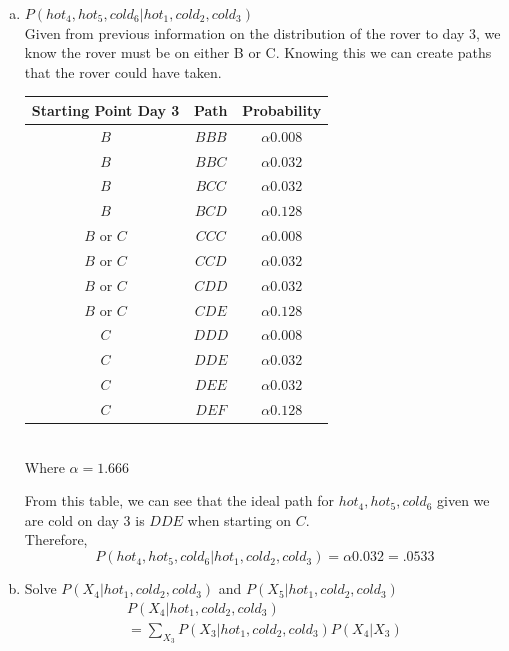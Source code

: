 \documentclass{article}
\begin{document}
\begin{enumerate}[a)]
    \clearpage
    \item $P(hot_4, hot_5, cold_6 | hot_1, cold_2, cold_3)$\\
        Given from previous information on the distribution of the rover to day 3, we know
        the rover must be on either B or C. Knowing this we can create paths that the rover
        could have taken.\\
        \begin{center}
        \begin{tabular}{|c|c|c|}
            \hline
            Starting Point Day 3 & Path & Probability \\
            \hline
            $B$ & $BBB$ & $\alpha 0.008$\\
            $B$ & $BBC$ & $\alpha 0.032$\\
            $B$ & $BCC$ & $\alpha 0.032$\\
            $B$ & $BCD$ & $\alpha 0.128$\\
            $B$ or $C$ & $CCC$ & $\alpha 0.008$\\
            $B$ or $C$ & $CCD$ & $\alpha 0.032$\\
            $B$ or $C$ & $CDD$ & $\alpha 0.032$\\
            $B$ or $C$ & $CDE$ & $\alpha 0.128$\\
            $C$ & $DDD$ & $\alpha 0.008$\\
            $C$ & $DDE$ & $\alpha 0.032$\\
            $C$ & $DEE$ & $\alpha 0.032$\\
            $C$ & $DEF$ & $\alpha 0.128$\\
            \hline
        \end{tabular}\\
        Where $\alpha = 1.666$
        \end{center}
        From this table, we can see that the ideal path for $hot_4, hot_5, cold_6$ given
        we are cold on day 3 is $DDE$ when starting on $C$.\\
        Therefore, 
        \[
            P(hot_4, hot_5, cold_6 | hot_1, cold_2, cold_3) = \alpha 0.032 = .0533
        \]
    \clearpage
    \item Solve $P(X_4|hot_1,cold_2,cold_3)$ and $P(X_5|hot_1,cold_2,cold_3)$
    \begin{gather*}
        P(X_4|hot_1,cold_2,cold_3)\\
        = \sum_{X_3}P(X_3|hot_1,cold_2,cold_3)P(X_4|X_3)
    \end{gather*}

\end{enumerate}
\end{document}
